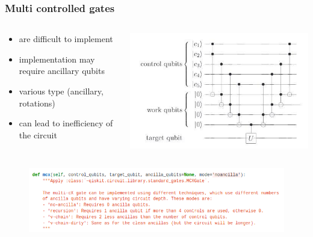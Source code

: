 \documentclass{beamer}
\begin{document}
\begin{frame}
    \frametitle{Multi controlled gates}
    \begin{columns}
        \begin{column}{.5\textwidth}
            \begin{itemize}
                \item \small are difficult to implement
                \item \small implementation may require ancillary qubits
                \item \small various type (ancillary, rotations)
                \item \small can lead to inefficiency of the circuit
            \end{itemize}
        \end{column}
        \begin{column}{.5\textwidth}
            \includegraphics[scale=0.4]{img/ancillary.jpg}
        \centering
        \end{column}
    \end{columns}

    \begin{figure}[h!]
        \includegraphics[scale=0.5]{img/mcx.png}
        \centering
    \end{figure}
\end{frame}
\end{document}
